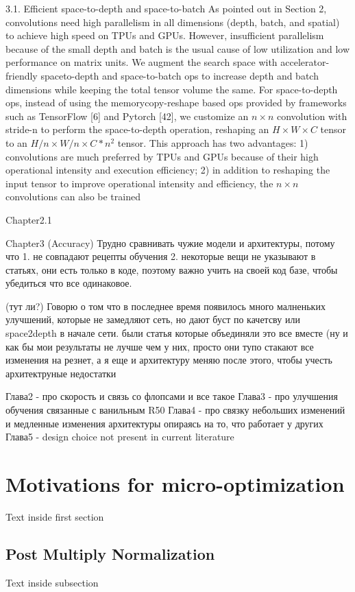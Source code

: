 3.1. Efficient space-to-depth and space-to-batch
As pointed out in Section 2, convolutions need high parallelism in all dimensions (depth, batch, and spatial) to achieve high speed on TPUs and GPUs. However, insufficient parallelism because of the small depth and batch is the usual cause of low utilization and low performance on matrix units. We augment the search space with accelerator-friendly spaceto-depth and space-to-batch ops to increase depth and batch dimensions while keeping the total tensor volume the same. For space-to-depth ops, instead of using the memorycopy-reshape based ops provided by frameworks such as TensorFlow [6] and Pytorch [42], we customize an $n \times n$ convolution with stride-n to perform the space-to-depth operation, reshaping an $H \times W \times C$ tensor to an $H / n \times W / n \times C * n^{2}$ tensor. This approach has two advantages: 1) convolutions are much preferred by TPUs and GPUs because of their high operational intensity and execution efficiency; 2) in addition to reshaping the input tensor to improve operational intensity and efficiency, the $n \times n$ convolutions can also be trained



Chapter2.1


Chapter3 (Accuracy)
Трудно сравнивать чужие модели и архитектуры, потому что 1. не совпадают рецепты обучения 2. некоторые вещи не указывают в статьях, они есть только в коде, поэтому важно учить на своей код базе, чтобы убедиться что все одинаковое. 

(тут ли?)
Говорю о том что в последнее время появилось много малненьких улучшений, которые не замедляют сеть, но дают буст по качетсву \cite{zhang2019making_aa_shift_invariant} или space2depth  \cite{ridnik2021_tresnet} в начале сети. были статья которые объединяли это все вместе \cite{lee2020compounding_improvements} \cite{bello2021revisiting_resnet} (ну и как бы мои результаты не лучше чем у них, просто они тупо стакают все изменения на резнет, а я еще и архитектуру меняю после этого, чтобы учесть архитектруные недостатки


Глава2 - про скорость и связь со флопсами и все такое
Глава3 - про улучшения обучения связанные с ванильным R50
Глава4 - про связку небольших изменений и медленные изменения архитектуры опираясь на то, что работает у других
Глава5 - design choice not present in current literature


\section{Motivations for micro-optimization}

Text inside first section

\subsection{Post Multiply Normalization}

Text inside subsection
